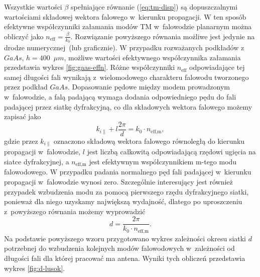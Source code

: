 Wszystkie wartości $\beta$ spełniające  równanie (\ref{eq:tm-disp}) są dopuszczalnymi wartościami składowej wektora falowego w~kierunku propagacji. W ten sposób efektywne współczynniki załamania modów TM w~falowodzie planarnym można obliczyć jako $n_{\textrm{eff}}=\frac{\beta}{k_0}$. Rozwiązanie powyższego równania możliwe jest jedynie na drodze numerycznej~(lub graficznie). W przypadku rozważanych podkładów z~$GaAs$, $h=400$~$\mu m$, możliwe wartości efektywnego współczynnika załamania przedstawia wykres \ref{fig:gaas-effn}. Różne współczynniki $n_{\textrm{eff}}$ odpowiadające tej samej długości fali wynikają z~wielomodowego charakteru falowodu tworzonego przez podkład $GaAs$. Dopasowanie pędowe między modem prowadzonym w~falowodzie, a falą padającą wymaga dodania odpowiedniego pędu do fali padającej przez siatkę dyfrakcyjną, co dla składowych wektora falowego możemy zapisać jako
\[
k_{i \parallel} + l \frac{2\pi}{d} = k_0 \cdot n_{\textrm{eff,m}}, 
\]
gdzie przez $k_{i \parallel}$ oznaczono składową wektora falowego równoległą do kierunku propagacji w~falowodzie, $l$ jest liczbą całkowitą odpowiadającą rzędowi ugięcia na siatce dyfrakcyjnej, a $n_{\textrm{eff,m}}$ jest efektywnym współczynnikiem m-tego modu falowodowego. W przypadku padania normalnego pęd fali padającej w~kierunku propagacji w~falowodzie wynosi zero. Szczególnie interesujący jest również przypadek wzbudzenia modu za pomocą pierwszego rzędu dyfrakcyjnego siatki, ponieważ dla niego uzyskamy największą wydajność, dlatego po uproszczeniu z~powyższego równania możemy wyprowadzić
\begin{equation}
d=\frac{2 \pi}{k_0 \cdot n_{\textrm{eff,m}}}.
\label{eq:d-do-wzbudzenia}
\end{equation}
Na podstawie powyższego wzoru przygotowano wykres zależności okresu siatki $d$ potrzebnej do wzbudzenia kolejnych modów falowodowych w~zależności od długości fali dla której pracować ma antena. Wyniki tych obliczeń przedstawia wykres \ref{fig:d-lusok}.

